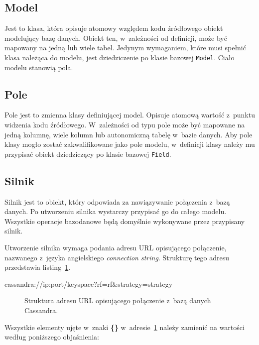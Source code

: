 \subsection{Model}

Jest to klasa, która opisuje atomowy względem kodu źródłowego obiekt modelujący bazę danych. Obiekt ten, w~zależności od definicji, może być mapowany na jedną lub wiele tabel. Jedynym wymaganiem, które musi spełnić klasa należąca do modelu, jest dziedziczenie po klasie bazowej \verb+Model+. Ciało modelu stanowią pola.

\subsection{Pole}

Pole jest to zmienna klasy definiującej model. Opisuje atomową wartość z~punktu widzenia kodu źródłowego. W~zależności od typu pole może być mapowane na jedną kolumnę, wiele kolumn lub autonomiczną tabelę w~bazie danych. Aby pole klasy mogło zostać zakwalifikowane jako pole modelu, w~definicji klasy należy mu przypisać obiekt dziedziczący po klasie bazowej \verb+Field+.

\subsection{Silnik}

Silnik jest to obiekt, który odpowiada za nawiązywanie połączenia z~bazą danych. Po utworzeniu silnika wystarczy przypisać go do całego modelu. Wszystkie operacje bazodanowe będą domyślnie wykonywane przez przypisany silnik. 

Utworzenie silnika wymaga podania adresu URL opisującego połączenie, nazwanego z~języka angielskiego \emph{connection string}. Strukturę tego adresu przedstawia listing~\ref{lst:connection_string}.

\begin{verbbox}[\footnotesize]
	cassandra://{ip}:{port}/{keyspace}?rf={rf}&strategy={strategy}
\end{verbbox}

\begin{figure}[ht!]
	\centering
	\theverbbox
	\caption{Struktura adresu URL opisującego połączenie z~bazą danych Cassandra.}
	\label{lst:connection_string}
\end{figure}

Wszystkie elementy ujęte w~znaki \textbf{\{\}} w~adresie~\ref{lst:connection_string} należy zamienić na wartości według poniższego objaśnienia:

